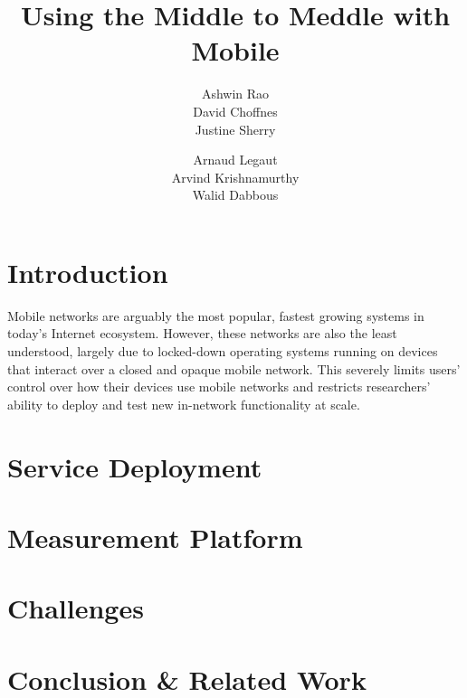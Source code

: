 \documentclass{sig-alternate-10pt}
\title{Using the Middle to Meddle with Mobile\vspace{-25pt}}
\author{
\alignauthor
Ashwin Rao\\
\affaddr{INRIA}
\alignauthor        
David Choffnes\\
\affaddr{University of Washington}
\alignauthor
Justine Sherry\\
\affaddr{UC Berkeley}
\and
\alignauthor
Arnaud Legaut\\
\affaddr{INRIA}
\alignauthor 
Arvind Krishnamurthy\\
\affaddr{University of Washington}
\alignauthor
Walid Dabbous\\
\affaddr{INRIA}
}
\date{}
\begin{document}
	
    \maketitle
        
    \section{Introduction}
Mobile networks are arguably the most popular, fastest
growing systems in today’s Internet ecosystem. 
However, these networks are also the least understood, largely
due to locked-down operating systems running on devices that interact over a closed and opaque mobile network. 
This severely limits users’ control over how their
devices use mobile networks and restricts researchers’
ability to deploy and test new in-network functionality
at scale. 
 
    \section{Service Deployment}

    \section{Measurement Platform}

    \section{Challenges}

    \section{Conclusion \& Related Work}
   
 
    \scriptsize
    
    
    \normalsize
\end{document}

